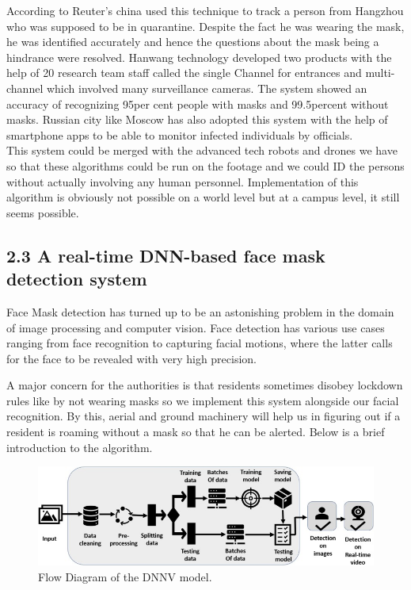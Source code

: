 \documentclass[eng]{FCEFyN-class}
\begin{document}
According to Reuter’s china used this technique to track a person from Hangzhou who was supposed to be in quarantine. Despite the fact he was wearing the mask, he was identified accurately and hence the questions about the mask being a hindrance were resolved. Hanwang technology developed two products with the help of 20 research team staff called the single Channel for entrances and multi-channel which involved many surveillance cameras. The system showed an accuracy of recognizing 95per cent people with masks and 99.5percent without masks.  Russian city like Moscow has also adopted this system with the help of smartphone apps to be able to monitor infected individuals by officials. \\

This system could be merged with the advanced tech robots and drones we have so that these algorithms could be run on the footage and we could ID the persons without actually involving any human personnel. Implementation of this algorithm is obviously not possible on a world level but at a campus level, it still seems possible.

\subsection{2.3  A real-time DNN-based face mask detection system }
Face Mask detection has turned up to be an astonishing problem in the domain of image processing and computer vision. Face detection has various use cases ranging from face recognition to capturing facial motions, where the latter calls for the face to be revealed with very high precision.

A major concern for the authorities is that residents sometimes disobey lockdown rules like by not wearing masks so we implement this system alongside our facial recognition. By this, aerial and ground machinery will help us in figuring out if a resident is roaming without a mask so that he can be alerted. Below is a brief introduction to the algorithm.\\

\begin{figure}[!htb]
 \includegraphics[scale=2]{filesFCEFyN-class/gr1_lrg.jpg} 
 \caption{Flow Diagram of the DNNV model.} 
 \label{fig-2}
\end{figure}
\end{document}

